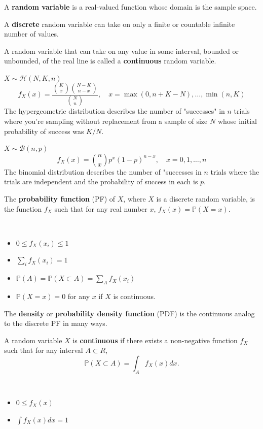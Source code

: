 \documentclass[a4paper,10pt,landscape]{article}
\begin{document}
\begin{multicols*}{3}
\begin{description}
	\item A {\bf random variable} is a real-valued function whose domain is the sample space.
	\item A {\bf discrete} random variable can take on only a finite or countable infinite number of values.
	\item A random variable that can take on any value in some interval, bounded or unbounded, of the real line is called a {\bf continuous} random variable.
	\item[Hypergeometric Distribution] $X\sim\mathcal{H}\left(N, K, n\right)$
	$$f_X(x)=\dfrac{\binom{K}{x}\binom{N-K}{n-x}}{\binom{N}{n}},\quad x=\max\left(0,n+K-N\right),\dots,\min\left(n,K\right)$$
	The hypergeometric distribution describes the number of "successes" in $n$ trials where you're sampling without replacement from a sample of size $N$ whose initial probability of success was $K/N$.
	\item[Binomial Distribution] $X\sim\mathcal{B}(n,p)$
	$$f_X(x)=\binom{n}{x}p^x(1-p)^{n-x},\quad x=0,1,\dots,n$$
	The binomial distribution describes the number of "successes in $n$ trials where the trials are independent and the probability of success in each is $p$.
	\item The {\bf probability function} (PF) of $X$, where $X$ is a discrete random variable, is the function $f_X$ such that for any real number $x$, $f_X(x)=\mathbb{P}(X=x)$.
	\item[Properties:] ~
	\begin{itemize}
		\item $0\leq f_X(x_i)\leq1$
		\item $\sum\limits_{i}f_X(x_i)=1$
		\item $\mathbb{P}(A)=\mathbb{P}(X\subset A)=\sum\limits_{A}f_X(x_i)$
		\item $\mathbb{P}(X=x)=0$ for any $x$ if $X$ is continuous.
	\end{itemize}
	\item The {\bf density} or {\bf probability density function} (PDF) is the continuous analog to the discrete PF in many ways.
	\item A random variable $X$ is {\bf continuous} if there exists a non-negative function $f_X$ such that for any interval $A\subset R$, 
	$$\mathbb{P}(X\subset A)=\int_{A}f_X(x)dx.$$
	\item[Properties:] ~
	\begin{itemize}
		\item $0\leq f_X(x)$
		\item $\int f_X(x)dx=1$

\end{itemize}
\end{description}
\end{multicols*}
\end{document}
